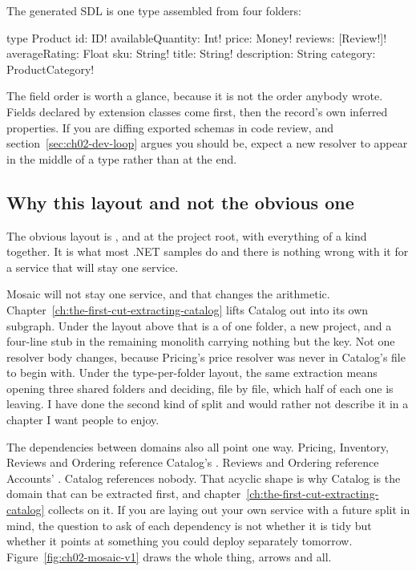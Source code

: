 The generated SDL is one type assembled from four folders:

\begin{graphqlsdl}
type Product {
  id: ID!
  availableQuantity: Int!
  price: Money!
  reviews: [Review!]!
  averageRating: Float
  sku: String!
  title: String!
  description: String
  category: ProductCategory!
}
\end{graphqlsdl}

%
The field order is worth a glance, because it is not the order anybody wrote.
Fields declared by extension classes come first, then the record's own inferred
properties. If you are diffing exported schemas in code review, and
section~\ref{sec:ch02-dev-loop} argues you should be, expect a new resolver to
appear in the middle of a type rather than at the end.

\subsection*{Why this layout and not the obvious one}

The obvious layout is ,  and  at the
project root, with everything of a kind together. It is what most .NET samples
do and there is nothing wrong with it for a service that will stay one service.

Mosaic will not stay one service, and that changes the arithmetic.
Chapter~\ref{ch:the-first-cut-extracting-catalog} lifts Catalog out into its own
subgraph. Under the layout above that is a  of one folder, a new
project, and a four-line  stub in the remaining monolith carrying
nothing but the key. Not one resolver body changes, because Pricing's price
resolver was never in Catalog's file to begin with. Under the type-per-folder
layout, the same extraction means opening three shared folders and deciding, file
by file, which half of each one is leaving. I have done the second kind of split
and would rather not describe it in a chapter I want people to enjoy.

%
The dependencies between domains also all point one way. Pricing, Inventory,
Reviews and Ordering reference Catalog's . Reviews and Ordering
reference Accounts' . Catalog references nobody. That acyclic
shape is why Catalog is the domain that can be extracted first, and
chapter~\ref{ch:the-first-cut-extracting-catalog} collects
on it. If you are laying out your own service with a future split in mind, the
question to ask of each dependency is not whether it is tidy but whether it
points at something you could deploy separately tomorrow.
Figure~\ref{fig:ch02-mosaic-v1} draws the whole thing, arrows and all.

